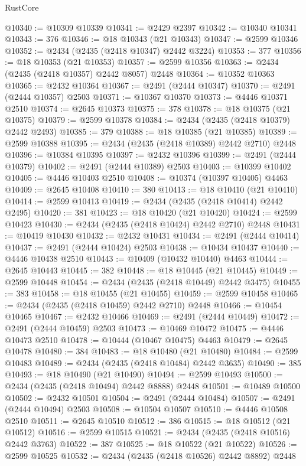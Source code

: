 \begin{lexlean}{RustCore}
\begin{coremodule}
@10340 := @10309 @10339
@10341 := @2429 @2397
@10342 := @10340 @10341
@10343 := 376
@10346 := @18 @10343 (@21 @10343)
@10347 := @2599 @10346
@10352 := @2434 (@2435 (@2418 @10347) @2442 @3224)
@10353 := 377
@10356 := @18 @10353 (@21 @10353)
@10357 := @2599 @10356
@10363 := @2434 (@2435 (@2418 @10357) @2442 @8057) @2448
@10364 := @10352 @10363
@10365 := @2432 @10364
@10367 := @2491 (@2444 @10347)
@10370 := @2491 (@2444 @10357) @2503
@10371 := @10367 @10370
@10373 := @4446 @10371 @2510
@10374 := @2645 @10373
@10375 := 378
@10378 := @18 @10375 (@21 @10375)
@10379 := @2599 @10378
@10384 := @2434 (@2435 (@2418 @10379) @2442 @2493)
@10385 := 379
@10388 := @18 @10385 (@21 @10385)
@10389 := @2599 @10388
@10395 := @2434 (@2435 (@2418 @10389) @2442 @2710) @2448
@10396 := @10384 @10395
@10397 := @2432 @10396
@10399 := @2491 (@2444 @10379)
@10402 := @2491 (@2444 @10389) @2503
@10403 := @10399 @10402
@10405 := @4446 @10403 @2510
@10408 := @10374 (@10397 @10405) @4463
@10409 := @2645 @10408
@10410 := 380
@10413 := @18 @10410 (@21 @10410)
@10414 := @2599 @10413
@10419 := @2434 (@2435 (@2418 @10414) @2442 @2495)
@10420 := 381
@10423 := @18 @10420 (@21 @10420)
@10424 := @2599 @10423
@10430 := @2434 (@2435 (@2418 @10424) @2442 @2710) @2448
@10431 := @10419 @10430
@10432 := @2432 @10431
@10434 := @2491 (@2444 @10414)
@10437 := @2491 (@2444 @10424) @2503
@10438 := @10434 @10437
@10440 := @4446 @10438 @2510
@10443 := @10409 (@10432 @10440) @4463
@10444 := @2645 @10443
@10445 := 382
@10448 := @18 @10445 (@21 @10445)
@10449 := @2599 @10448
@10454 := @2434 (@2435 (@2418 @10449) @2442 @3475)
@10455 := 383
@10458 := @18 @10455 (@21 @10455)
@10459 := @2599 @10458
@10465 := @2434 (@2435 (@2418 @10459) @2442 @2710) @2448
@10466 := @10454 @10465
@10467 := @2432 @10466
@10469 := @2491 (@2444 @10449)
@10472 := @2491 (@2444 @10459) @2503
@10473 := @10469 @10472
@10475 := @4446 @10473 @2510
@10478 := @10444 (@10467 @10475) @4463
@10479 := @2645 @10478
@10480 := 384
@10483 := @18 @10480 (@21 @10480)
@10484 := @2599 @10483
@10489 := @2434 (@2435 (@2418 @10484) @2442 @3635)
@10490 := 385
@10493 := @18 @10490 (@21 @10490)
@10494 := @2599 @10493
@10500 := @2434 (@2435 (@2418 @10494) @2442 @8888) @2448
@10501 := @10489 @10500
@10502 := @2432 @10501
@10504 := @2491 (@2444 @10484)
@10507 := @2491 (@2444 @10494) @2503
@10508 := @10504 @10507
@10510 := @4446 @10508 @2510
@10511 := @2645 @10510
@10512 := 386
@10515 := @18 @10512 (@21 @10512)
@10516 := @2599 @10515
@10521 := @2434 (@2435 (@2418 @10516) @2442 @3763)
@10522 := 387
@10525 := @18 @10522 (@21 @10522)
@10526 := @2599 @10525
@10532 := @2434 (@2435 (@2418 @10526) @2442 @8892) @2448

\end{coremodule}
\end{lexlean}
